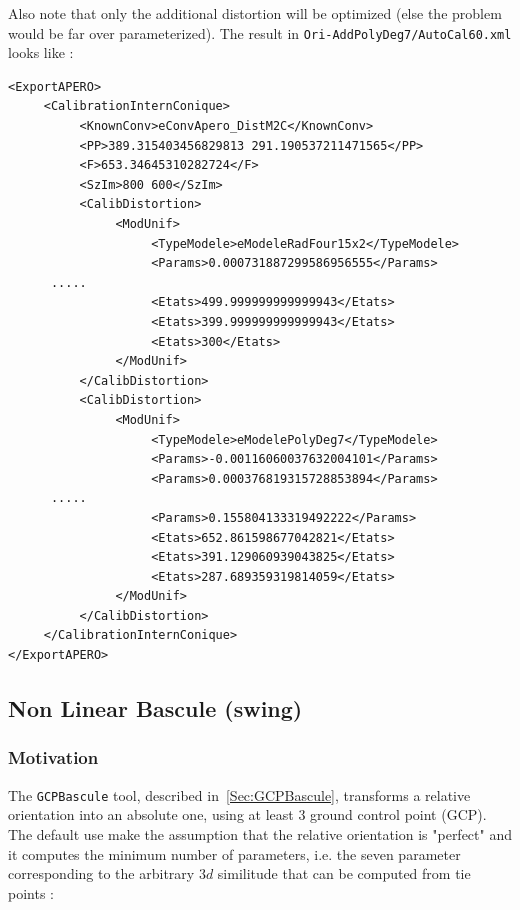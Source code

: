 Also note that only the additional distortion will be optimized (else the problem would be far over parameterized).
The result in {\tt Ori-AddPolyDeg7/AutoCal60.xml} looks like :

{\tiny
\begin{verbatim}
<ExportAPERO>
     <CalibrationInternConique>
          <KnownConv>eConvApero_DistM2C</KnownConv>
          <PP>389.315403456829813 291.190537211471565</PP>
          <F>653.34645310282724</F>
          <SzIm>800 600</SzIm>
          <CalibDistortion>
               <ModUnif>
                    <TypeModele>eModeleRadFour15x2</TypeModele>
                    <Params>0.000731887299586956555</Params>
      .....
                    <Etats>499.999999999999943</Etats>
                    <Etats>399.999999999999943</Etats>
                    <Etats>300</Etats>
               </ModUnif>
          </CalibDistortion>
          <CalibDistortion>
               <ModUnif>
                    <TypeModele>eModelePolyDeg7</TypeModele>
                    <Params>-0.00116060037632004101</Params>
                    <Params>0.000376819315728853894</Params>
      .....
                    <Params>0.155804133319492222</Params>
                    <Etats>652.861598677042821</Etats>
                    <Etats>391.129060939043825</Etats>
                    <Etats>287.689359319814059</Etats>
               </ModUnif>
          </CalibDistortion>
     </CalibrationInternConique>
</ExportAPERO>

\end{verbatim}
}


\subsection{Non Linear Bascule (swing)}

\subsubsection{Motivation}

\label{NonLin:GCPBascule}

The {\tt GCPBascule} tool, described in~\ref{Sec:GCPBascule}, transforms a relative orientation
into an absolute one, using at least $3$ ground control point (GCP). The default use make
the assumption that the relative orientation is "perfect" and it computes the minimum number
of parameters, i.e. the seven parameter corresponding to the arbitrary $3d$ similitude
 that can be computed from tie points :

